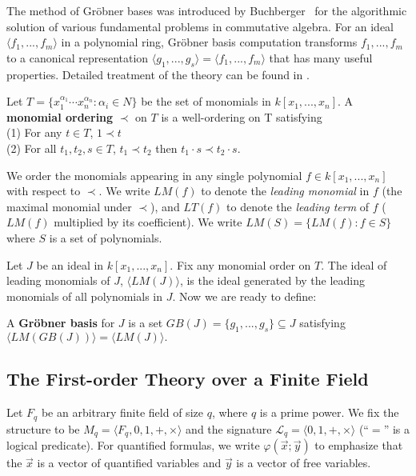 \documentclass[envcountsect]{llncs}
\begin{document}
The method of Gr\"obner bases was introduced by Buchberger~\cite{buchberger76} for the algorithmic solution of various fundamental problems in commutative algebra. For an ideal $\langle f_1,...,f_m\rangle$ in a polynomial ring, Gr\"obner basis computation transforms $f_1,...,f_m$ to a canonical representation $\langle g_1,...,g_s\rangle=\langle f_1,...,f_m\rangle$ that has many useful properties. Detailed treatment of the theory can be found in \cite{grobnerbook}. 

\begin{definition}
Let $T=\{x_1^{\alpha_1}\cdots x_n^{\alpha_n}: \alpha_i\in N\}$ be the set of monomials in $k[x_1,...,x_n]$. A {\bf monomial ordering} $\prec$ on $T$ is a well-ordering on T satisfying \\(1)
For any $t\in T$, $1\prec t$\\(2) For all $t_1, t_2, s\in T$, $t_1\prec t_2$ then $t_1\cdot s\prec t_2\cdot s$.
\end{definition}

We order the monomials appearing in any single polynomial $f\in k[x_1,...,x_n]$ with respect to $\prec$. We write $LM(f)$ to denote the {\em leading monomial} in $f$ (the maximal monomial under $\prec$), and $LT(f)$ to denote the {\em leading term} of $f$ ($LM(f)$ multiplied by its coefficient). We write $LM(S)=\{LM(f):f\in S\}$ where $S$ is a set of polynomials.

Let $J$ be an ideal in $k[x_1,...,x_n]$. Fix any monomial order on $T$. The ideal of leading
monomials of $J$, $\langle LM(J)\rangle$, is the ideal generated by the leading monomials of all polynomials in $J$. Now we are ready to define:
\begin{definition}
A {\bf Gr\"obner basis} for $J$ is a set $GB(J)=\{g_1,...,g_s\}\subseteq J$ satisfying $\langle LM(GB(J)) \rangle=\langle
LM(J)\rangle.$ 
\end{definition}

\subsection{The First-order Theory over a Finite Field}

Let $F_q$ be an arbitrary finite field of size $q$, where $q$ is a prime power. We fix the structure to be $M_q=\langle F_q, 0, 1, +, \times\rangle$ and the signature $\mathcal{L}_q=\langle 0,1, +,\times \rangle$ (``$=$'' is a logical predicate). For quantified formulas, we write $\varphi(\vec x; \vec y)$ to emphasize that the $\vec x$ is a vector of quantified variables and $\vec y$ is a vector of free variables.
\end{document}
